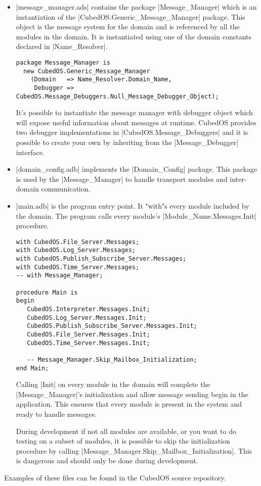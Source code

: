 \begin{itemize}
\item |message_manager.ads| contains the package |Message_Manager| which is an instantiation of
the |CubedOS.Generic_Message_Manager| package. This object is the message system for the domain
and is referenced by all the modules in the domain. It is instantiated using one of the domain
constants declared in |Name_Resolver|.

\begin{verbatim}
package Message_Manager is
  new CubedOS.Generic_Message_Manager
    (Domain   => Name_Resolver.Domain_Name,
     Debugger => CubedOS.Message_Debuggers.Null_Message_Debugger_Object);
\end{verbatim}

It's possible to instantiate the message manager with debugger object which will expose useful
information about messages at runtime. CubedOS provides two debugger implementations in
|CubedOS.Message_Debuggers| and it is possible to create your own by inheriting from the
|Message_Debugger| interface.

\item |domain_config.adb| implements the |Domain_Config| package. This package is used by the
|Message_Manager| to handle transport modules and inter-domain communication.

\item |main.adb| is the program entry point. It "with"s every module included by the domain. The
program calls every module's |Module_Name.Messages.Init| procedure.

\begin{verbatim}
with CubedOS.File_Server.Messages;
with CubedOS.Log_Server.Messages;
with CubedOS.Publish_Subscribe_Server.Messages;
with CubedOS.Time_Server.Messages;
-- with Message_Manager;

procedure Main is
begin
   CubedOS.Interpreter.Messages.Init;
   CubedOS.Log_Server.Messages.Init;
   CubedOS.Publish_Subscribe_Server.Messages.Init;
   CubedOS.File_Server.Messages.Init;
   CubedOS.Time_Server.Messages.Init;

   -- Message_Manager.Skip_Mailbox_Initialization;
end Main;
\end{verbatim}

Calling |Init| on every module in the domain will complete the |Message_Manager|'s initialization
and allow message sending begin in the application. This ensures that every module is present in
the system and ready to handle messages.

During development if not all modules are available, or you want to do testing on a subset of
modules, it is possible to skip the initialization procedure by calling
|Message_Manager.Skip_Mailbox_Initialization|. This is dangerous and should only be done during
development.
\end{itemize}

Examples of these files can be found in the CubedOS source repository.

